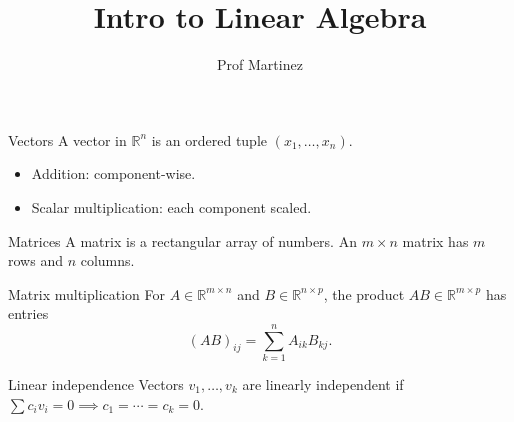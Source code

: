 \documentclass[handout]{beamer}
\title{Intro to Linear Algebra}
\author{Prof Martinez}
\begin{document}
\begin{frame}
  \titlepage
\end{frame}

\begin{frame}{Vectors}
  A vector in $\mathbb{R}^n$ is an ordered tuple $(x_1, \ldots, x_n)$.
  \begin{itemize}
    \item Addition: component-wise.
    \item Scalar multiplication: each component scaled.
  \end{itemize}
\end{frame}

\begin{frame}{Matrices}
  A matrix is a rectangular array of numbers. An $m \times n$ matrix has $m$ rows and $n$ columns.
\end{frame}

\begin{frame}{Matrix multiplication}
  For $A \in \mathbb{R}^{m \times n}$ and $B \in \mathbb{R}^{n \times p}$, the product $AB \in \mathbb{R}^{m \times p}$ has entries
  $$ (AB)_{ij} = \sum_{k=1}^{n} A_{ik} B_{kj}. $$
\end{frame}

\begin{frame}{Linear independence}
  Vectors $v_1, \ldots, v_k$ are linearly independent if
  $\sum c_i v_i = 0 \implies c_1 = \cdots = c_k = 0$.
\end{frame}
\end{document}

